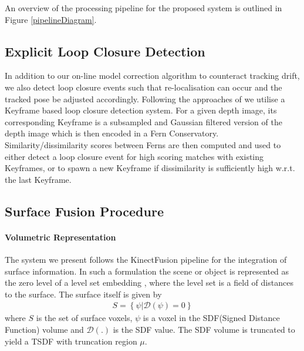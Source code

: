 An overview of the processing pipeline for the proposed system is outlined in Figure \ref{pipelineDiagram}.
\fi

\subsection{Explicit Loop Closure Detection}
In addition to our on-line model correction algorithm to counteract tracking drift, we also detect loop closure events such that re-localisation can occur and 
the tracked pose be adjusted accordingly. Following the approaches of \cite{Glocker15,Kahler2016} we utilise a Keyframe based loop closure detection system. For a 
given depth image, its corresponding Keyframe is a subsampled and Gaussian filtered version of the depth image which is then encoded in a Fern Conservatory. 
Similarity/dissimilarity scores between Ferns are then computed and used to either detect a loop closure event for high scoring matches with existing Keyframes, 
or to spawn a new Keyframe if dissimilarity is sufficiently high w.r.t. the last Keyframe.

\subsection{Surface Fusion Procedure}
\paragraph{Volumetric Representation}
The system we present follows the KinectFusion \cite{Newcombe2011} pipeline for the integration of surface information. In such a 
formulation the scene or object is represented as the zero level of a level set embedding \cite{Curless1996}, where the level set is a field of distances 
to the surface. The surface itself is given by
\begin{equation}
	\begin{split}
		S = \left\{\psi | \mathcal{D}(\psi) = 0\right\}
	\end{split}
\end{equation}
where $S$ is the set of surface voxels, $\psi$ is a voxel in the SDF(Signed Distance Function) volume and $\mathcal{D}(.)$ is the SDF value. 
The SDF volume is truncated to yield a TSDF with truncation region $\mu$.

